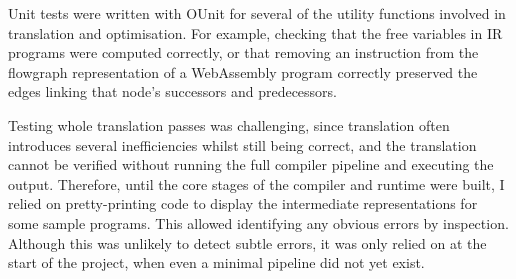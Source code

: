 
Unit tests were written with OUnit \cite{ounit} for several of the utility functions involved in translation and optimisation. For example, checking that the free variables in IR programs  were computed correctly, or that removing an instruction from the flowgraph representation of a WebAssembly program correctly preserved the edges linking that node's successors and predecessors.


Testing whole translation passes was challenging, since translation often introduces several inefficiencies whilst still being correct, and the translation cannot be verified without running the full compiler pipeline and executing the output. Therefore, until the core stages of the compiler and runtime were built, I relied on pretty-printing code to display the intermediate representations for some sample programs. This allowed identifying any obvious errors by inspection. Although this was unlikely to detect subtle errors, it was only relied on at the start of the project, when even a minimal pipeline did not yet exist.




